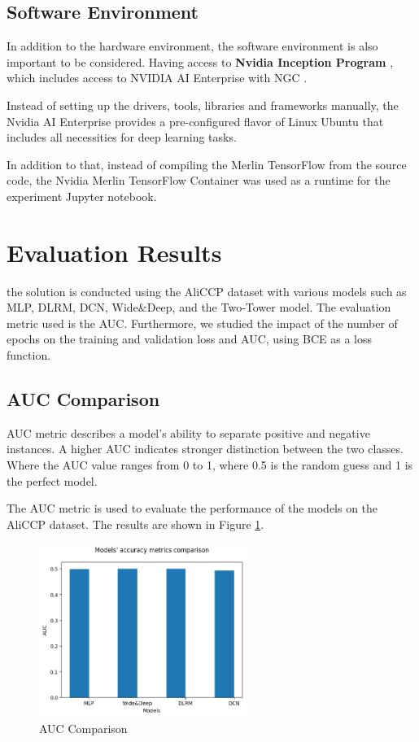 \subsection{Software Environment}

In addition to the hardware environment, the software environment is also important to be considered.
Having access to \textbf{Nvidia Inception Program} \cite{NvidiaStartups}, 
which includes access to NVIDIA AI Enterprise \cite{NvidiaAiEnterprise} with NGC \cite{NvidiaNGC}.

Instead of setting up the drivers, tools, libraries and frameworks manually, 
the Nvidia AI Enterprise provides a pre-configured flavor of Linux Ubuntu that includes all necessities for deep learning tasks.

In addition to that, instead of compiling the Merlin TensorFlow from the source code, 
the Nvidia Merlin TensorFlow Container \cite{NvidiaMerlinTf} was used as a runtime for the experiment Jupyter notebook.


\section{Evaluation Results}
the solution is conducted using the AliCCP dataset with various models such as MLP, DLRM, DCN, Wide\&Deep, and the Two-Tower model. The evaluation metric used is the AUC. Furthermore, we studied the impact of the number of epochs on the training and validation loss and AUC, using BCE as a loss function.
\subsection{AUC Comparison}

AUC metric describes a model's ability to separate positive and negative instances. A higher AUC indicates stronger distinction between the two classes. Where the AUC value ranges from 0 to 1, where 0.5 is the random guess and 1 is the perfect model.

The AUC metric is used to evaluate the performance of the models on the AliCCP dataset. The results are shown in Figure \ref{fig:AUCComparison}.
\begin{figure}[H]
    \centering
    \includegraphics[width=0.6\textwidth]{assets/models_comparasion.png}
    \caption[AUC Comparison]{AUC Comparison}
    \label{fig:AUCComparison}
\end{figure}

